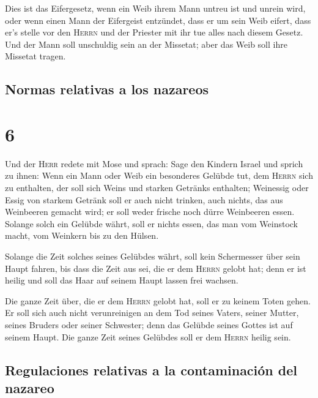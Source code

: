  Dies ist das Eifergesetz, wenn ein Weib ihrem Mann
untreu ist und unrein wird,  oder wenn einen Mann der
Eifergeist entzündet, dass er um sein Weib eifert, dass er's stelle vor
den \textsc{Herrn} und der Priester mit ihr tue alles nach diesem
Gesetz.  Und der Mann soll unschuldig sein an der
Missetat; aber das Weib soll ihre Missetat tragen.

\hypertarget{normas-relativas-a-los-nazareos}{%
\subsection{Normas relativas a los
nazareos}\label{normas-relativas-a-los-nazareos}}

\hypertarget{section-5}{%
\section{6}\label{section-5}}

 Und der \textsc{Herr} redete mit Mose und sprach:
 Sage den Kindern Israel und sprich zu ihnen: Wenn ein
Mann oder Weib ein besonderes Gelübde tut, dem \textsc{Herrn} sich zu
enthalten,  der soll sich Weins und starken Getränks
enthalten; Weinessig oder Essig von starkem Getränk soll er auch nicht
trinken, auch nichts, das aus Weinbeeren gemacht wird; er soll weder
frische noch dürre Weinbeeren essen.  Solange solch ein
Gelübde währt, soll er nichts essen, das man vom Weinstock macht, vom
Weinkern bis zu den Hülsen.

 Solange die Zeit solches seines Gelübdes währt, soll kein
Schermesser über sein Haupt fahren, bis dass die Zeit aus sei, die er
dem \textsc{Herrn} gelobt hat; denn er ist heilig und soll das Haar auf
seinem Haupt lassen frei wachsen.

 Die ganze Zeit über, die er dem \textsc{Herrn} gelobt
hat, soll er zu keinem Toten gehen.  Er soll sich auch
nicht verunreinigen an dem Tod seines Vaters, seiner Mutter, seines
Bruders oder seiner Schwester; denn das Gelübde seines Gottes ist auf
seinem Haupt.  Die ganze Zeit seines Gelübdes soll er dem
\textsc{Herrn} heilig sein.

\hypertarget{regulaciones-relativas-a-la-contaminaciuxf3n-del-nazareo}{%
\subsection{Regulaciones relativas a la contaminación del
nazareo}\label{regulaciones-relativas-a-la-contaminaciuxf3n-del-nazareo}}

